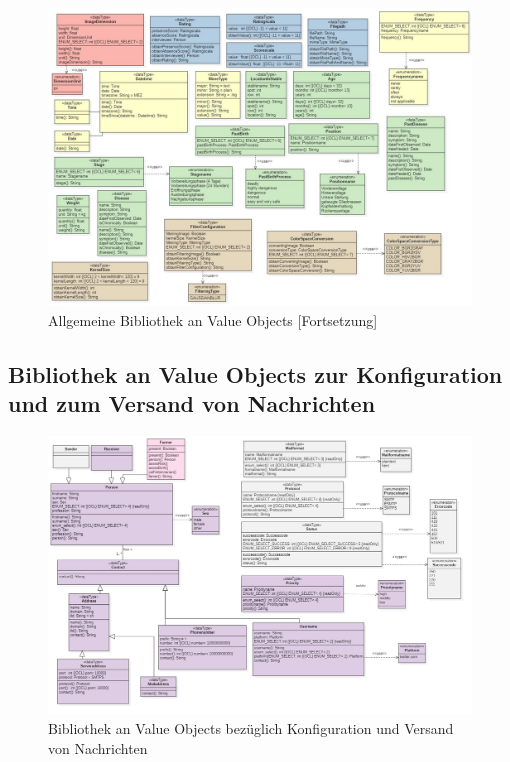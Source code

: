 \begin{landscape}
\begin{figure}[H]
	\center
	\includegraphics[scale=1.8]{Grafiken/modelle/vo-general1.jpg}
	\caption{Allgemeine Bibliothek an Value Objects  [Fortsetzung]}
	\label{fig: Allgemeine Bibliothek an Value Objects [Fortsetzung]} 
\end{figure}

\subsection{Bibliothek an Value Objects zur Konfiguration und zum Versand von Nachrichten}
\begin{figure}[H]
	\center
	\includegraphics[scale=0.38]{Grafiken/modelle/vo-messaging.jpg}
	\caption{Bibliothek an Value Objects bezüglich Konfiguration und Versand von Nachrichten} 
	\label{fig: Bibliothek an Value Objects zur Konfiguration und zum Versand von Nachrichten}
\end{figure}


\end{landscape}
\restoregeometry %
